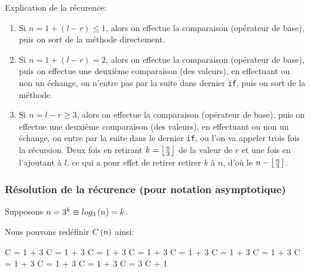 \documentclass[class=article]{standalone}
\begin{document}
Explication de la récurence:
\begin{enumerate}
    \item Si $n = 1+(l-r) \leq 1$, alors on effectue la comparaison (opérateur de base), 
    puis on sort de la méthode directement.
    \item Si $n = 1+(l-r) = 2$, alors on effectue la comparaison (opérateur de base), 
    puis on effectue une deuxième comparaison (des valeurs), en effectuant ou non 
    un échange, on n'entre pas par la suite dans dernier \lstinline{if}, puis on sort de la méthode.
    \item Si $n = l-r \geq 3$, alors on effectue la comparaison (opérateur de base),
    puis on effectue une deuxième comparaison (des valeurs), en effectuant ou non 
    un échange, on entre par la suite dans le dernier \lstinline{if}, ou l'on
    va appeler trois fois la récursion. Deux fois en retirant $k = \left \lfloor \frac{n}{3} \right \rfloor$ 
    de la valeur de $r$ et une fois en l'ajoutant à $l$, ce qui a pour effet de 
    retirer retirer $k$ à $n$, d'où le $n-\left \lfloor \frac{n}{3} \right \rfloor$.
\end{enumerate}

\subsubsection*{Résolution de la récurence (pour notation asymptotique)}
Supposons $n = 3^k \equiv log_{3}\left ( n \right ) = k$.

Nous pouvons redéfinir $C\left ( n \right )$ ainsi:

\begin{deriv}
    C
    \<= 
    1 + 3 \cdot C
    \<= 
    1 + 3 \cdot C
    \<= 
    1 + 3 \cdot C
    \<= 
    1 + 3 \cdot C
    \<= 
    1 + 3 \cdot C
    \<= 
    1 + 3 \cdot C
    \<= 
    1 + 3 \cdot C
    \<= 
    1 + 3 \cdot C
    \<= 
    1 + 3 \cdot C
    \<= 
    1 + 3 \cdot C
    \<= 
    3 \cdot C + 1
    \<\in
    \Theta{}
    \<\simeq
    \Theta{}
\end{deriv}
\end{document}

